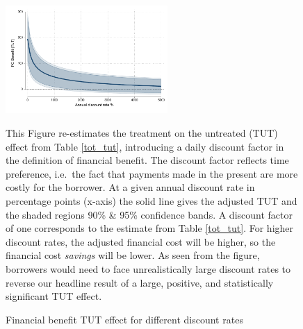 \begin{figure}[H]
        \caption{Financial benefit TUT effect for different discount rates}
    \label{fc_discount_rates}
    \begin{center}
        \centering
        \includegraphics[width=0.55\textwidth]{Figuras/discount_effect_tut.pdf}
    \end{center}
     \scriptsize This Figure re-estimates the treatment on the untreated (TUT) effect from Table \ref{tot_tut}, introducing a daily discount factor in the definition of financial benefit. The discount factor reflects time preference, i.e.\ the fact that payments made in the present are more costly for the borrower. At a given annual discount rate in percentage points (x-axis) the solid line gives the adjusted TUT and the shaded regions 90\% \& 95\% confidence bands. A discount factor of one corresponds to the estimate from Table \ref{tot_tut}. For higher discount rates, the adjusted financial cost will be higher, so the financial cost \emph{savings} will be lower. As seen from the figure, borrowers would need to face unrealistically large discount rates to reverse our headline result of a large, positive, and statistically significant TUT effect.
\end{figure}





